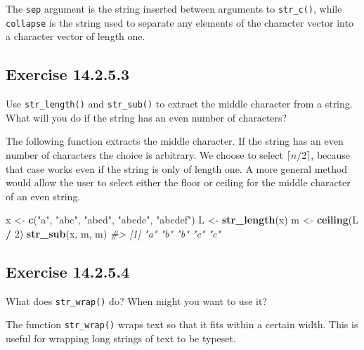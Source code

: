 \documentclass[]{book}
\newenvironment{Shaded}{\begin{snugshade}}{\end{snugshade}}
\newcommand{\CommentTok}[1]{\textcolor[rgb]{0.56,0.35,0.01}{\textit{#1}}}
\newcommand{\DecValTok}[1]{\textcolor[rgb]{0.00,0.00,0.81}{#1}}
\newcommand{\KeywordTok}[1]{\textcolor[rgb]{0.13,0.29,0.53}{\textbf{#1}}}
\newcommand{\NormalTok}[1]{#1}
\newcommand{\OperatorTok}[1]{\textcolor[rgb]{0.81,0.36,0.00}{\textbf{#1}}}
\newcommand{\StringTok}[1]{\textcolor[rgb]{0.31,0.60,0.02}{#1}}
\theoremstyle{plain}
\theoremstyle{remark}
\begin{document}
The \texttt{sep} argument is the string inserted between arguments to
\texttt{str\_c()}, while \texttt{collapse} is the string used to
separate any elements of the character vector into a character vector of
length one.

\hypertarget{exercise-14.2.5.3}{%
\subsection*{\texorpdfstring{Exercise
{14.2.5.3}}{Exercise 14.2.5.3}}\label{exercise-14.2.5.3}}

Use \texttt{str\_length()} and \texttt{str\_sub()} to extract the middle
character from a string. What will you do if the string has an even
number of characters?

The following function extracts the middle character. If the string has
an even number of characters the choice is arbitrary. We choose to
select \(\lceil n / 2 \rceil\), because that case works even if the
string is only of length one. A more general method would allow the user
to select either the floor or ceiling for the middle character of an
even string.

\begin{Shaded}
\begin{Highlighting}[]
\NormalTok{x <-}\StringTok{ }\KeywordTok{c}\NormalTok{(}\StringTok{"a"}\NormalTok{, }\StringTok{"abc"}\NormalTok{, }\StringTok{"abcd"}\NormalTok{, }\StringTok{"abcde"}\NormalTok{, }\StringTok{"abcdef"}\NormalTok{)}
\NormalTok{L <-}\StringTok{ }\KeywordTok{str_length}\NormalTok{(x)}
\NormalTok{m <-}\StringTok{ }\KeywordTok{ceiling}\NormalTok{(L }\OperatorTok{/}\StringTok{ }\DecValTok{2}\NormalTok{)}
\KeywordTok{str_sub}\NormalTok{(x, m, m)}
\CommentTok{#> [1] "a" "b" "b" "c" "c"}
\end{Highlighting}
\end{Shaded}

\hypertarget{exercise-14.2.5.4}{%
\subsection*{\texorpdfstring{Exercise
{14.2.5.4}}{Exercise 14.2.5.4}}\label{exercise-14.2.5.4}}

What does \texttt{str\_wrap()} do? When might you want to use it?

The function \texttt{str\_wrap()} wraps text so that it fits within a
certain width. This is useful for wrapping long strings of text to be
typeset.
\end{document}
